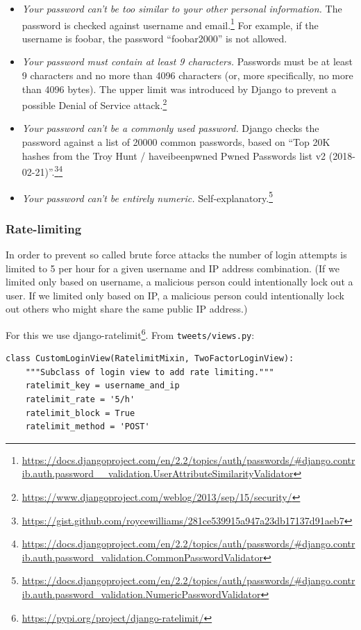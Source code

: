 \documentclass[11pt,english]{article}
\begin{document}
\begin{itemize}
  \item\emph{Your password can't be too similar to your other personal information.} The password is checked against username and email.\footnote{\url{https://docs.djangoproject.com/en/2.2/topics/auth/passwords/\#django.contrib.auth.password__validation.UserAttributeSimilarityValidator}} For example, if the username is foobar, the password “foobar2000” is not allowed.
  \item\emph{Your password must contain at least 9 characters.} Passwords must be at least 9 characters and no more than 4096 characters (or, more specifically, no more than 4096 bytes). The upper limit was introduced by Django to prevent a possible Denial of Service attack.\footnote{\url{https://www.djangoproject.com/weblog/2013/sep/15/security/}}
  \item\emph{Your password can't be a commonly used password.} Django checks the password against a list of 20000 common passwords, based on “Top 20K hashes from the Troy Hunt / haveibeenpwned Pwned Passwords list v2 (2018-02-21)”.\footnote{\url{https://gist.github.com/roycewilliams/281ce539915a947a23db17137d91aeb7}}\footnote{\url{https://docs.djangoproject.com/en/2.2/topics/auth/passwords/\#django.contrib.auth.password\_validation.CommonPasswordValidator}}
  \item\emph{Your password can't be entirely numeric.} Self-explanatory.\footnote{\url{https://docs.djangoproject.com/en/2.2/topics/auth/passwords/\#django.contrib.auth.password\_validation.NumericPasswordValidator}}
\end{itemize}

\subsubsection{Rate-limiting}
In order to prevent so called brute force attacks the number of login attempts is limited to 5 per hour for a given username and IP address combination. (If we limited only based on username, a malicious person could intentionally lock out a user. If we limited only based on IP, a malicious person could intentionally lock out others who might share the same public IP address.)

For this we use django-ratelimit\footnote{\url{https://pypi.org/project/django-ratelimit/}}. From \lstinline{tweets/views.py}:

\begin{verbatim}
class CustomLoginView(RatelimitMixin, TwoFactorLoginView):
    """Subclass of login view to add rate limiting."""
    ratelimit_key = username_and_ip
    ratelimit_rate = '5/h'
    ratelimit_block = True
    ratelimit_method = 'POST'
\end{verbatim}
\end{document}
